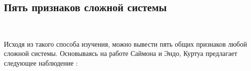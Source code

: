 \documentclass[11pt]{article}
\begin{document}
\subsection{Пять признаков сложной системы}
\

Исходя из такого способа изучения, можно вывести пять общих признаков любой сложной системы. Основываясь на работе Саймона и Эндо, Куртуа предлагает следующее наблюдение :
\parskip=2mm
\end{document}
